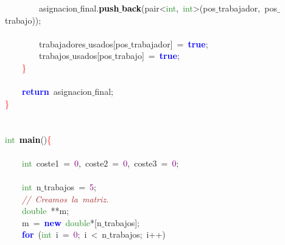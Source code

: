 \mbox{}\ \ \ \ \ \ \ \ asignacion$\_$final\textcolor{BrickRed}{.}\textbf{\textcolor{Black}{push$\_$back}}\textcolor{BrickRed}{(}pair\textcolor{BrickRed}{\textless{}}\textcolor{ForestGreen}{int}\textcolor{BrickRed}{,}\ \textcolor{ForestGreen}{int}\textcolor{BrickRed}{\textgreater{}(}pos$\_$trabajador\textcolor{BrickRed}{,}\ pos$\_$trabajo\textcolor{BrickRed}{));} \\
\mbox{} \\
\mbox{}\ \ \ \ \ \ \ \ trabajadores$\_$usados\textcolor{BrickRed}{[}pos$\_$trabajador\textcolor{BrickRed}{]}\ \textcolor{BrickRed}{=}\ \textbf{\textcolor{Blue}{true}}\textcolor{BrickRed}{;}\  \\
\mbox{}\ \ \ \ \ \ \ \ trabajos$\_$usados\textcolor{BrickRed}{[}pos$\_$trabajo\textcolor{BrickRed}{]}\ \textcolor{BrickRed}{=}\ \textbf{\textcolor{Blue}{true}}\textcolor{BrickRed}{;}\  \\
\mbox{}\ \ \ \ \textcolor{Red}{\}} \\
\mbox{} \\
\mbox{}\ \ \ \ \textbf{\textcolor{Blue}{return}}\ asignacion$\_$final\textcolor{BrickRed}{;}\  \\
\mbox{}\textcolor{Red}{\}} \\
\mbox{} \\
\mbox{} \\
\mbox{}\textcolor{ForestGreen}{int}\ \textbf{\textcolor{Black}{main}}\textcolor{BrickRed}{()}\textcolor{Red}{\{} \\
\mbox{} \\
\mbox{}\ \ \ \ \textcolor{ForestGreen}{int}\ coste1\ \textcolor{BrickRed}{=}\ \textcolor{Purple}{0}\textcolor{BrickRed}{,}\ coste2\ \textcolor{BrickRed}{=}\ \textcolor{Purple}{0}\textcolor{BrickRed}{,}\ coste3\ \textcolor{BrickRed}{=}\ \textcolor{Purple}{0}\textcolor{BrickRed}{;}\ \  \\
\mbox{} \\
\mbox{}\ \ \ \ \textcolor{ForestGreen}{int}\ n$\_$trabajos\ \textcolor{BrickRed}{=}\ \textcolor{Purple}{5}\textcolor{BrickRed}{;}\  \\
\mbox{}\ \ \ \ \textit{\textcolor{Brown}{//\ Creamos\ la\ matriz.\ }} \\
\mbox{}\ \ \ \ \textcolor{ForestGreen}{double}\ \textcolor{BrickRed}{**}m\textcolor{BrickRed}{;}\  \\
\mbox{}\ \ \ \ m\ \textcolor{BrickRed}{=}\ \textbf{\textcolor{Blue}{new}}\ \textcolor{ForestGreen}{double}\textcolor{BrickRed}{*[}n$\_$trabajos\textcolor{BrickRed}{];}\  \\
\mbox{}\ \ \ \ \textbf{\textcolor{Blue}{for}}\ \textcolor{BrickRed}{(}\textcolor{ForestGreen}{int}\ i\ \textcolor{BrickRed}{=}\ \textcolor{Purple}{0}\textcolor{BrickRed}{;}\ i\ \textcolor{BrickRed}{\textless{}}\ n$\_$trabajos\textcolor{BrickRed}{;}\ i\textcolor{BrickRed}{++)} \\

